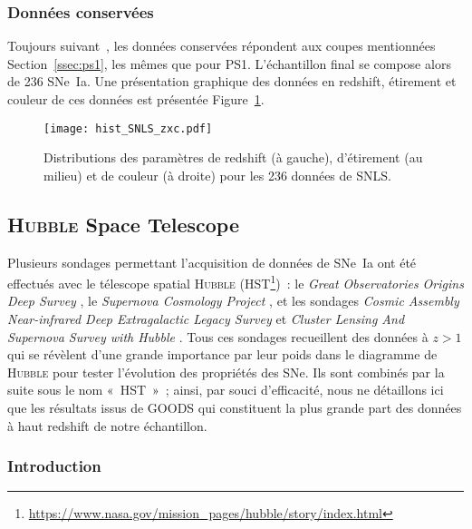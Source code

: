 \documentclass[../main/main.tex]{subfiles}
\begin{document}
\subsubsection{Données conservées}\label{ssec:snlsdata}

Toujours suivant~\cite{scolnic2018}, les données conservées répondent aux coupes
mentionnées Section~\ref{ssec:ps1}, les mêmes que pour PS1. L'échantillon final
se compose alors de 236 SNe~Ia. Une présentation graphique des données en
redshift, étirement et couleur de ces données est présentée
Figure~\ref{fig:snlshist}.

\begin{figure}[ht]
    \centering
    \texttt{[image: hist\_SNLS\_zxc.pdf]}
    \captionsetup{justification=centering}
    \caption{Distributions des paramètres de redshift (à gauche), d'étirement (au
    milieu) et de couleur (à droite) pour les 236 données de SNLS.}
    \label{fig:snlshist}
\end{figure}

\subsection{\textsc{Hubble} Space Telescope}\label{ssec:hst}

Plusieurs sondages permettant l'acquisition de données de SNe~Ia ont été
effectués avec le télescope spatial \textsc{Hubble}
(HST\footnote{\href{https://www.nasa.gov/mission_pages/hubble/story/index.html}
{https://www.nasa.gov/mission\_pages/hubble/story/index.html}})~: le
\textit{Great Observatories Origins Deep
Survey} \citep[GOODS,][]{giavalisco2004, strolger2004, riess2007}, le
\textit{Supernova Cosmology Project} \citep[SCP,][]{suzuki2012}, et les sondages
\textit{Cosmic Assembly Near-infrared Deep Extragalactic Legacy
Survey} \citep[CANDELS,][]{rodney2014} et \textit{Cluster Lensing And Supernova
Survey with Hubble} \citep[CLASH,][]{graur2014}. Tous ces sondages recueillent
des données à $z > 1$ qui se révèlent d'une grande importance par leur poids
dans le diagramme de \textsc{Hubble} pour tester l'évolution des propriétés des
SNe. Ils sont combinés par la suite sous le nom «~HST~»~; ainsi, par souci
d'efficacité, nous ne détaillons ici que les résultats issus de GOODS qui
constituent la plus grande part des données à haut redshift de notre
échantillon.

\subsubsection{Introduction}\label{sssec:hstintro}
\end{document}
